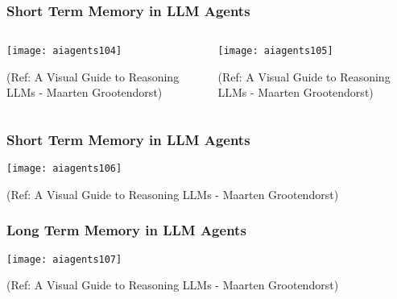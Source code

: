 \begin{frame}[fragile]\frametitle{Short Term Memory in LLM Agents}


\begin{columns}
    \begin{column}[T]{0.6\linewidth}
        \begin{center}
        \texttt{[image: aiagents104]}

		
        {\tiny (Ref: A Visual Guide to Reasoning LLMs - Maarten Grootendorst)}
        \end{center}

    \end{column}
    \begin{column}[T]{0.4\linewidth}
        \begin{center}
        \texttt{[image: aiagents105]}

		
        {\tiny (Ref: A Visual Guide to Reasoning LLMs - Maarten Grootendorst)}
        \end{center}
    \end{column}
  \end{columns}

\end{frame}

\begin{frame}[fragile]\frametitle{Short Term Memory in LLM Agents}



        \begin{center}
        \texttt{[image: aiagents106]}

		
        {\tiny (Ref: A Visual Guide to Reasoning LLMs - Maarten Grootendorst)}
        \end{center}

\end{frame}

\begin{frame}[fragile]\frametitle{Long Term Memory in LLM Agents}



        \begin{center}
        \texttt{[image: aiagents107]}

		
        {\tiny (Ref: A Visual Guide to Reasoning LLMs - Maarten Grootendorst)}
        \end{center}

\end{frame}

